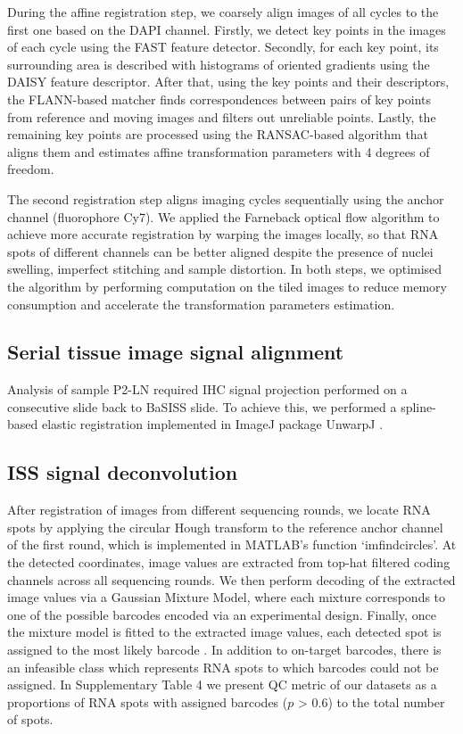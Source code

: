 During the affine registration step, we coarsely align images of all cycles to the first one based on the DAPI channel. Firstly, we detect key points in the images of each cycle using the FAST feature detector. Secondly, for each key point, its surrounding area is described with histograms of oriented gradients using the DAISY feature descriptor. After that, using the key points and their descriptors, the FLANN-based matcher finds correspondences between pairs of key points from reference and moving images and filters out unreliable points. Lastly, the remaining key points are processed using the RANSAC-based algorithm that aligns them and estimates affine transformation parameters with 4 degrees of freedom.

The second registration step aligns imaging cycles sequentially using the anchor channel (fluorophore Cy7). We applied the Farneback optical flow algorithm to achieve more accurate registration by warping the images locally, so that RNA spots of different channels can be better aligned despite the presence of nuclei swelling, imperfect stitching and sample distortion. In both steps, we optimised the algorithm by performing computation on the tiled images to reduce memory consumption and accelerate the transformation parameters estimation.

\subsection{Serial tissue image signal alignment}
\label{sec:protocol-suppl-image-align}

Analysis of sample P2-LN required \ac{IHC} signal projection performed on a consecutive slide back to \ac{BaSISS} slide. To achieve this, we performed a spline-based elastic registration implemented in ImageJ package UnwarpJ \parencite{Arganda-Carreras2008-gb}. 

\subsection{\ac{ISS} signal deconvolution}
\label{sec:protocol-suppl-image-deconvolution}

After registration of images from different sequencing rounds, we locate RNA spots by applying the circular Hough transform to the reference anchor channel of the first round, which is implemented in MATLAB's function `imfindcircles'. At the detected coordinates, image values are extracted from top-hat filtered coding channels across all sequencing rounds. We then perform decoding of the extracted image values via a Gaussian Mixture Model, where each mixture corresponds to one of the possible barcodes encoded via an experimental design. Finally, once the mixture model is fitted to the extracted image values, each detected spot is assigned to the most likely barcode \parencite{Gataric2021-yt}. In addition to on-target barcodes, there is an infeasible class which represents RNA spots to which barcodes could not be assigned. In Supplementary Table 4 we present QC metric of our datasets as a proportions of RNA spots with assigned barcodes ($p$ > 0.6) to the total number of spots. 


